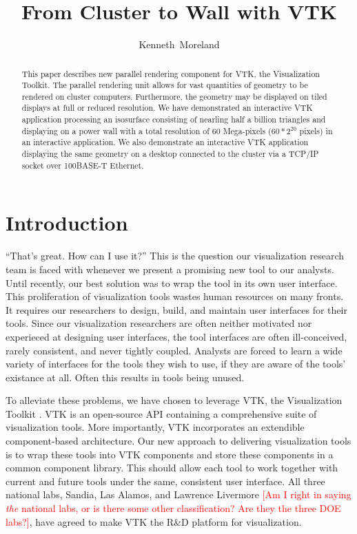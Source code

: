 \documentclass[twocolumn]{article}
\title{From Cluster to Wall with VTK}
\author{Kenneth~Moreland}
\newcommand{\sticky}[1]{\textcolor{Red}{[#1]}}
\begin{document}
\maketitle

\begin{abstract}
  This paper describes new parallel rendering component for VTK, the
  Visualization Toolkit.  The parallel rendering unit allows for vast
  quantities of geometry to be rendered on cluster computers.  Furthermore,
  the geometry may be displayed on tiled displays at full or reduced
  resolution.  We have demonstrated an interactive VTK application
  processing an isosurface consisting of nearling half a billion triangles
  and displaying on a power wall with a total resolution of 60 Mega-pixels
  ($60*2^{20}$ pixels) in an interactive application.  We also demonstrate
  an interactive VTK application displaying the same geometry on a desktop
  connected to the cluster via a TCP/IP socket over 100BASE-T Ethernet.
\end{abstract}

\section{Introduction}
\label{sec:introduction}

``That's great.  How can I use it?''  This is the question our
visualization research team is faced with whenever we present a promising
new tool to our analysts.  Until recently, our best solution was to wrap
the tool in its own user interface.  This proliferation of visualization
tools wastes human resources on many fronts.  It requires our researchers
to design, build, and maintain user interfaces for their tools.  Since our
visualization researchers are often neither motivated nor experieced at
designing user interfaces, the tool interfaces are often ill-conceived,
rarely consistent, and never tightly coupled.  Analysts are forced to learn
a wide variety of interfaces for the tools they wish to use, if they are
aware of the tools' existance at all.  Often this results in tools being
unused.

To alleviate these problems, we have chosen to leverage VTK, the
Visualization Toolkit \cite{Schroeder98}.  VTK is an open-source API
containing a comprehensive suite of visualization tools.  More importantly,
VTK incorporates an extendible component-based architecture.  Our new
approach to delivering visualization tools is to wrap these tools into VTK
components and store these components in a common component library.  This
should allow each tool to work together with current and future tools under
the same, consistent user interface.  All three national labs, Sandia, Las
Alamos, and Lawrence Livermore \sticky{Am I right in saying \emph{the}
national labs, or is there some other classification?  Are they the three
DOE labs?}, have agreed to make VTK the R\&D platform for visualization.
\end{document}
